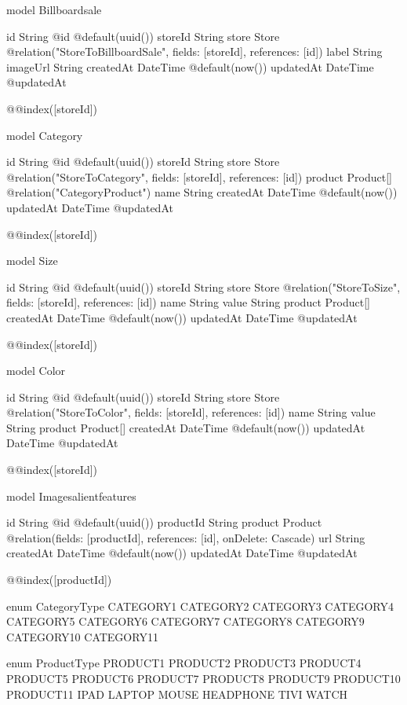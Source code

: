 model Billboardsale {
  id        String   @id @default(uuid())
  storeId   String
  store     Store    @relation("StoreToBillboardSale", fields: [storeId], references: [id])
  label     String
  imageUrl  String
  createdAt DateTime @default(now())
  updatedAt DateTime @updatedAt

  @@index([storeId])
}


model Category {
  id        String    @id @default(uuid())
  storeId   String
  store     Store     @relation("StoreToCategory", fields: [storeId], references: [id])
  product   Product[] @relation("CategoryProduct")
  name      String
  createdAt DateTime  @default(now())
  updatedAt DateTime  @updatedAt

  @@index([storeId])
}

model Size {
  id        String      @id @default(uuid())
  storeId   String
  store     Store       @relation("StoreToSize", fields: [storeId], references: [id])
  name      String
  value     String
  product   Product[]
  createdAt DateTime @default(now())
  updatedAt DateTime @updatedAt

  @@index([storeId])
}

model Color {
  id        String      @id @default(uuid())
  storeId   String
  store     Store       @relation("StoreToColor", fields: [storeId], references: [id])
  name      String
  value     String
  product   Product[]
  createdAt DateTime    @default(now())
  updatedAt DateTime    @updatedAt

  @@index([storeId])
}

model Imagesalientfeatures {
  id        String   @id @default(uuid())
  productId String
  product   Product  @relation(fields: [productId], references: [id], onDelete: Cascade)
  url       String
  createdAt DateTime @default(now())
  updatedAt DateTime @updatedAt

  @@index([productId])
}
enum CategoryType {
  CATEGORY1
  CATEGORY2
  CATEGORY3
  CATEGORY4
  CATEGORY5
  CATEGORY6
  CATEGORY7
  CATEGORY8
  CATEGORY9
  CATEGORY10
  CATEGORY11
}

enum ProductType {
  PRODUCT1
  PRODUCT2
  PRODUCT3
  PRODUCT4
  PRODUCT5
  PRODUCT6
  PRODUCT7
  PRODUCT8
  PRODUCT9
  PRODUCT10
  PRODUCT11
  IPAD
  LAPTOP
  MOUSE
  HEADPHONE
  TIVI
  WATCH
}


